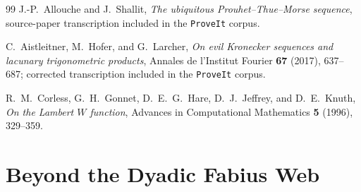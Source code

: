\documentclass[11pt]{article}
\makeatletter
\renewcommand{\headrulewidth}{0.3pt}
\numberwithin{equation}{section}
\let\frontier@normal@H@refstepcounter\H@refstepcounter
\let\frontier@normal@Hy@chapapp\Hy@chapapp
\newcommand{\frontierreportpart}[1]{%
  \clearpage
  \let\H@refstepcounter\frontier@normal@H@refstepcounter
  \let\Hy@chapapp\frontier@normal@Hy@chapapp
  \gdef\theHsection{\arabic{part}.\arabic{section}}%
  \setcounter{section}{0}%
  \renewcommand{\thesection}{\arabic{section}}%
  \part{#1}}
\theoremstyle{definition}
\theoremstyle{remark}
\makeatother
\begin{document}
\begin{thebibliography}{99}
J.-P.~Allouche and J.~Shallit,
\emph{The ubiquitous Prouhet--Thue--Morse sequence}, source-paper transcription included
in the \texttt{ProveIt} corpus.

C.~Aistleitner, M.~Hofer, and G.~Larcher,
\emph{On evil Kronecker sequences and lacunary trigonometric products},
Annales de l'Institut Fourier \textbf{67} (2017), 637--687; corrected transcription included
in the \texttt{ProveIt} corpus.

R.~M.~Corless, G.~H.~Gonnet, D.~E.~G.~Hare, D.~J.~Jeffrey, and D.~E.~Knuth,
\emph{On the Lambert $W$ function},
Advances in Computational Mathematics \textbf{5} (1996), 329--359.

\end{thebibliography}


\renewcommand{\headrulewidth}{0.4pt}
\newcommand{\VarPartiii}{\Variance}
\newcommand{\CovPartiii}{\Covariance}
\newcommand{\suppPartiii}{\SupportOperator}
\newcommand{\wtPartiii}{\BinaryDigitSum}
\newcommand{\LawPartiii}{\mathcal L}
\newcommand{\Normal}{\mathcal N}
\newcommand{\He}{\operatorname{He}}
\newcommand{\diagPartiii}{\DiagonalOperator}
\newcommand{\convexorder}{\preceq_{\mathrm{cx}}}

\frontierreportpart{Beyond the Dyadic Fabius Web}
\end{document}
